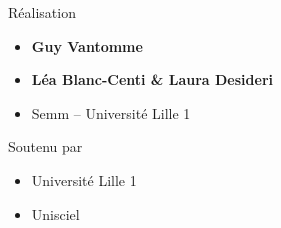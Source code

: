 \begin{frame}
\begin{minipage}{0.55\textwidth}
  \medskip

  Réalisation
  \begin{itemize}
    \item {\bf Guy Vantomme}
    \item {\bf \small Léa Blanc-Centi \& Laura Desideri}    
    \item Semm -- Université Lille 1
  \end{itemize}

  \medskip

  Soutenu par 
  \begin{itemize}
    \item Université Lille 1
    \item Unisciel
  \end{itemize}

  \end{minipage}  



\end{frame}


